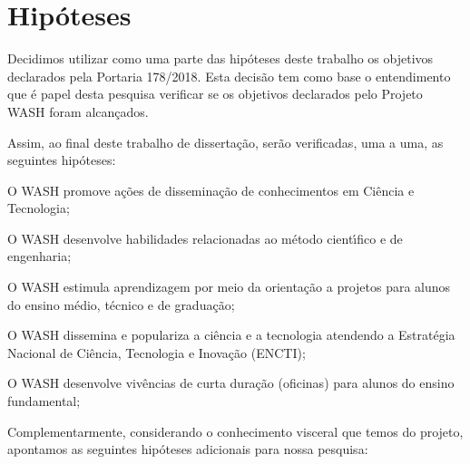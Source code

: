 \documentclass[
12pt,		%
openright,	%
twoside,  %
a4paper,			%
chapter=TITLE,		%
english,			%
french,				%
spanish,			%
brazil				%
]{USPSC-classe/USPSC}
\begin{document}
\section[Hip\'oteses]{Hip\'oteses}\label{Hip\'oteses}
Decidimos utilizar como uma parte das hip\'oteses deste trabalho os objetivos declarados pela Portaria 178/2018. Esta decis\~ao tem como base o entendimento que \'e papel desta pesquisa verificar se os objetivos declarados pelo Projeto WASH foram alcan\c{c}ados.










Assim, ao final deste trabalho de disserta\c{c}\~ao, ser\~ao verificadas, uma a uma, as seguintes hip\'oteses:











\begin{alineas}
\item O WASH promove a\c{c}\~oes de dissemina\c{c}\~ao de conhecimentos em Ci\^encia e Tecnologia;
\item O WASH desenvolve habilidades relacionadas ao m\'etodo cient\'{\i}fico e de engenharia;
\item O WASH estimula aprendizagem por meio da orienta\c{c}\~ao a projetos para alunos do ensino m\'edio, t\'ecnico e de gradua\c{c}\~ao;
\item O WASH dissemina e populariza a ci\^encia e a tecnologia atendendo a Estrat\'egia Nacional de Ci\^encia, Tecnologia e Inova\c{c}\~ao (ENCTI);
\item O WASH desenvolve viv\^encias de curta dura\c{c}\~ao (oficinas) para alunos do ensino fundamental;
\end{alineas}

Complementarmente, considerando o conhecimento visceral que temos do projeto, apontamos as seguintes hip\'oteses adicionais para nossa pesquisa:
\end{document}
